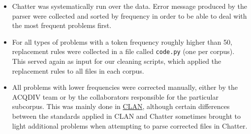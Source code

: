 \documentclass[a4paper, 11pt]{book}
\begin{document}
\begin{itemize} 
	\item Chatter was systematically run over the data. Error message produced by the parser were collected and sorted by frequency in order to be able to deal with the most frequent problems first. 
	\item For all types of problems with a token frequency roughly higher than 50, replacement rules were collected in a file called \texttt{code.py} (one per corpus). This served again as input for our cleaning scripts, which applied the replacement rules to all files in each corpus. 
	\item All problems with lower frequencies were corrected manually, either by the ACQDIV team or by the collaborators responsible for the particular subcorpus. This was mainly done in \href{http://childes.psy.cmu.edu/clan/}{CLAN}, although certain differences between the standards applied in CLAN and Chatter sometimes brought to light additional problems when attempting to parse corrected files in Chatter. 
\end{itemize}

\end{document}
